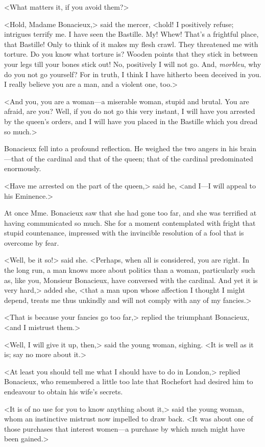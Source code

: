 <What matters it, if you avoid them?> 

<Hold, Madame Bonacieux,> said the mercer, <hold! I positively refuse; intrigues terrify me. I have seen the Bastille. My! Whew! That's a frightful place, that Bastille! Only to think of it makes my flesh crawl. They threatened me with torture. Do you know what torture is? Wooden points that they stick in between your legs till your bones stick out! No, positively I will not go. And, \textit{morbleu}, why do you not go yourself? For in truth, I think I have hitherto been deceived in you. I really believe you are a man, and a violent one, too.> 

<And you, you are a woman---a miserable woman, stupid and brutal. You are afraid, are you? Well, if you do not go this very instant, I will have you arrested by the queen's orders, and I will have you placed in the Bastille which you dread so much.> 

Bonacieux fell into a profound reflection. He weighed the two angers in his brain---that of the cardinal and that of the queen; that of the cardinal predominated enormously. 

<Have me arrested on the part of the queen,> said he, <and I---I will appeal to his Eminence.> 

At once Mme. Bonacieux saw that she had gone too far, and she was terrified at having communicated so much. She for a moment contemplated with fright that stupid countenance, impressed with the invincible resolution of a fool that is overcome by fear. 

<Well, be it so!> said she. <Perhaps, when all is considered, you are right. In the long run, a man knows more about politics than a woman, particularly such as, like you, Monsieur Bonacieux, have conversed with the cardinal. And yet it is very hard,> added she, <that a man upon whose affection I thought I might depend, treats me thus unkindly and will not comply with any of my fancies.> 

<That is because your fancies go too far,> replied the triumphant Bonacieux, <and I mistrust them.> 

<Well, I will give it up, then,> said the young woman, sighing. <It is well as it is; say no more about it.> 

<At least you should tell me what I should have to do in London,> replied Bonacieux, who remembered a little too late that Rochefort had desired him to endeavour to obtain his wife's secrets. 

<It is of no use for you to know anything about it,> said the young woman, whom an instinctive mistrust now impelled to draw back. <It was about one of those purchases that interest women---a purchase by which much might have been gained.> 

